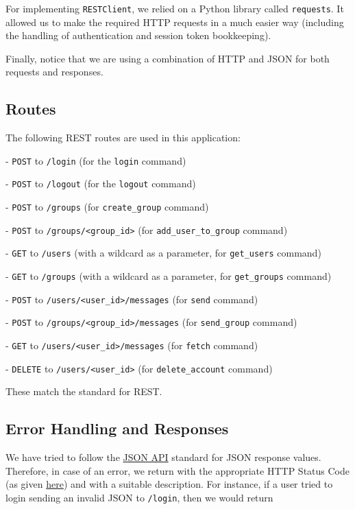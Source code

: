 \documentclass[10pt]{article}
\begin{document}
\medskip

For implementing \verb|RESTClient|, we relied on a Python library called \verb|requests|. It allowed us to make
the required HTTP requests in a much easier way (including the handling of authentication and session token bookkeeping).

\medskip

Finally, notice that we are using a combination of HTTP and JSON for both requests and responses.

\subsection{Routes}

The following REST routes are used in this application:

\medskip

- \verb|POST| to \verb|/login| (for the \verb|login| command)

- \verb|POST| to \verb|/logout| (for the \verb|logout| command)

- \verb|POST| to \verb|/groups| (for \verb|create_group| command)

- \verb|POST| to \verb|/groups/<group_id>| (for \verb|add_user_to_group| command)

- \verb|GET| to \verb|/users| (with a wildcard as a parameter, for \verb|get_users| command)

- \verb|GET| to \verb|/groups| (with a wildcard as a parameter, for \verb|get_groups| command)

- \verb|POST| to \verb|/users/<user_id>/messages| (for \verb|send| command)

- \verb|POST| to \verb|/groups/<group_id>/messages| (for \verb|send_group| command)

- \verb|GET| to \verb|/users/<user_id>/messages| (for \verb|fetch| command)

- \verb|DELETE| to \verb|/users/<user_id>| (for \verb|delete_account| command)

\medskip

These match the standard for REST.

\subsection{Error Handling and Responses}

We have tried to follow the \href{http://jsonapi.org/}{JSON API} standard for JSON response values. Therefore, in case
of an error, we return with the appropriate HTTP Status Code (as given \href{http://www.w3.org/Protocols/rfc2616/rfc2616-sec10.html}{here})
and with a suitable description. For instance, if a user tried to login sending an invalid JSON to \verb|/login|, then we would return
\end{document}
